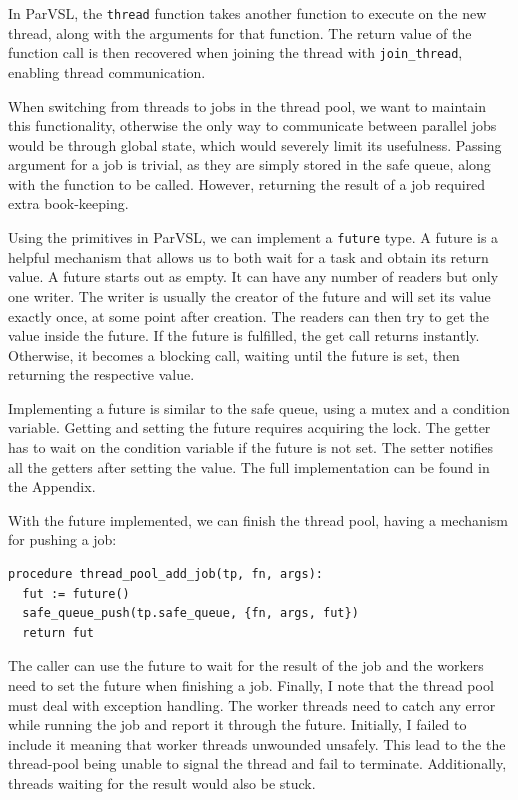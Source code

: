 In ParVSL, the \texttt{thread} function takes another function to execute on the new thread,
along with the arguments for that function. The return value of the function call is
then recovered when joining the thread with \texttt{join\_thread}, enabling thread communication.

When switching from threads to jobs in the thread pool, we want to maintain this functionality,
otherwise the only way to communicate between parallel jobs would be through global state,
which would severely limit its usefulness. Passing argument for a job is trivial, as they are simply
stored in the safe queue, along with the function to be called. However, returning the result of
a job required extra book-keeping.

Using the primitives in ParVSL, we can implement a \texttt{future} type. A future is a helpful mechanism
that allows us to both wait for a task and obtain its return value. A future starts out as empty.
It can have any number of readers but only one writer. The writer is usually the creator of the future
and will set its value exactly once, at some point after creation. The readers can then try to get the
value inside the future. If the future is fulfilled, the get call returns instantly. Otherwise, it
becomes a blocking call, waiting until the future is set, then returning the respective value.

Implementing a future is similar to the safe queue, using a mutex and a condition variable.
Getting and setting the future requires acquiring the lock. The getter has to wait on the condition
variable if the future is not set. The setter notifies all the getters after setting the value.
The full implementation can be found in the Appendix.

With the future implemented, we can finish the thread pool, having a mechanism for pushing a job:

\begin{verbatim}
procedure thread_pool_add_job(tp, fn, args):
  fut := future()
  safe_queue_push(tp.safe_queue, {fn, args, fut})
  return fut
\end{verbatim}

The caller can use the future to wait for the result of the job and the workers need to set the future
when finishing a job. Finally, I note that the thread pool must deal with exception handling. The worker threads
need to catch any error while running the job and report it through the future. Initially, I failed to include
it meaning that worker threads unwounded unsafely. This lead to the the thread-pool being unable to signal the
thread and fail to terminate. Additionally, threads waiting for the result would also be stuck.

